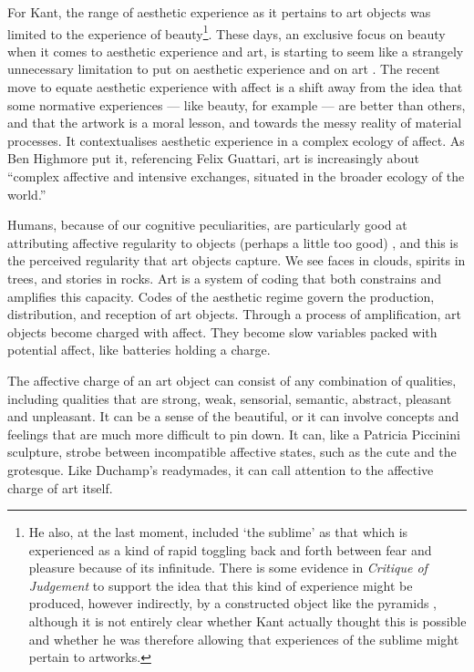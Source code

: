 \documentclass[letterpaper]{article}
\begin{document}
    For Kant, the range of aesthetic experience as it pertains to art objects was limited to the experience of beauty\footnote{
        He also, at the last moment, included ‘the sublime’ \citep[p.15]{ZepkeSblmArt2017} as that which is experienced as a kind of rapid toggling back and forth between fear and pleasure \citep[p.88]{KantCrtqOfJdgmnt} because of its infinitude. There is some evidence in \emph{Critique of Judgement} to support the idea that this kind of experience might be produced, however indirectly, by a constructed object like the pyramids \citep[p.82]{KantCrtqOfJdgmnt}, although it is not entirely clear whether Kant actually thought this is possible and whether he was therefore allowing that experiences of the sublime might pertain to artworks.
    }. These days, an exclusive focus on beauty when it comes to aesthetic experience and art, is starting to seem like a strangely unnecessary limitation to put on aesthetic experience and on art \citep[pp.121-122]{HighmoreBttrAftrTst2010}. The recent move to equate aesthetic experience with affect is a shift away from the idea that some normative experiences — like beauty, for example — are better than others, and that the artwork is a moral lesson, and towards the messy reality of material processes. It contextualises aesthetic experience in a complex ecology of affect. As Ben Highmore put it, referencing Felix Guattari, art is increasingly about “complex affective and intensive exchanges, situated in the broader ecology of the world.” \citep[p.155]{HighmoreBttrAftrTst2010}

    Humans, because of our cognitive peculiarities, are particularly good at attributing affective regularity to objects (perhaps a little too good) \citep{FristonThFrEnrgPrncpl2010} \citep{DeaconTheSymbolicSpecies1998}, and this is the perceived regularity that art objects capture. We see faces in clouds, spirits in trees, and stories in rocks. Art is a system of coding that both constrains and amplifies this capacity. Codes of the aesthetic regime govern the production, distribution, and reception of art objects. Through a process of amplification, art objects become charged with affect. They become slow variables packed with potential affect, like batteries holding a charge.

    The affective charge of an art object can consist of any combination of qualities, including qualities that are strong, weak, sensorial, semantic, abstract, pleasant and unpleasant. It can be a sense of the beautiful, or it can involve concepts and feelings that are much more difficult to pin down. It can, like a Patricia Piccinini sculpture, strobe between incompatible affective states, such as the cute and the grotesque. Like Duchamp's readymades, it can call attention to the affective charge of art itself.
\end{document}
